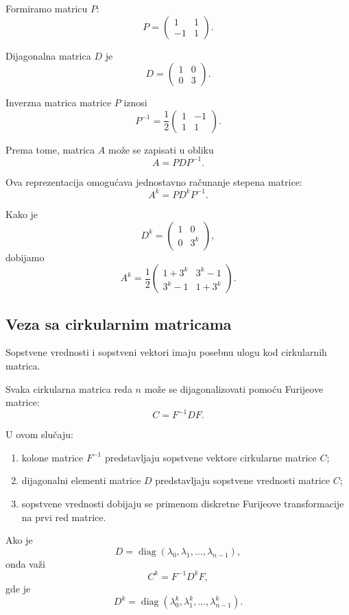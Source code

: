 \documentclass[12pt,a4paper]{report}
\begin{document}
Formiramo matricu $P$:
\[
P=
\begin{pmatrix}
	1 & 1\\
	-1 & 1
\end{pmatrix}.
\]

Dijagonalna matrica $D$ je
\[
D=
\begin{pmatrix}
	1 & 0\\
	0 & 3
\end{pmatrix}.
\]

Inverzna matrica matrice $P$ iznosi
\[
P^{-1}=
\frac{1}{2}
\begin{pmatrix}
	1 & -1\\
	1 & 1
\end{pmatrix}.
\]

Prema tome, matrica $A$ može se zapisati u obliku
\[
\boxed{
	A=PDP^{-1}.
}
\]

Ova reprezentacija omogućava jednostavno računanje
stepena matrice:
\[
A^k=PD^kP^{-1}.
\]

Kako je
\[
D^k=
\begin{pmatrix}
	1 & 0\\
	0 & 3^k
\end{pmatrix},
\]
dobijamo
\[
A^k=
\frac{1}{2}
\begin{pmatrix}
	1+3^k & 3^k-1\\
	3^k-1 & 1+3^k
\end{pmatrix}.
\]

\subsection{Veza sa cirkularnim matricama}

Sopstvene vrednosti i sopstveni vektori imaju posebnu
ulogu kod cirkularnih matrica.

Svaka cirkularna matrica reda $n$ može se dijagonalizovati
pomoću Furijeove matrice:
\[
\boxed{
	C=F^{-1}DF.
}
\]

U ovom slučaju:
\begin{enumerate}
	\item kolone matrice $F^{-1}$ predstavljaju sopstvene
	vektore cirkularne matrice $C$;
	\item dijagonalni elementi matrice $D$ predstavljaju
	sopstvene vrednosti matrice $C$;
	\item sopstvene vrednosti dobijaju se primenom
	diskretne Furijeove transformacije na prvi red matrice.
\end{enumerate}

Ako je
\[
D=\operatorname{diag}(\lambda_0,\lambda_1,\ldots,\lambda_{n-1}),
\]
onda važi
\[
C^k=F^{-1}D^kF,
\]
gde je
\[
D^k=
\operatorname{diag}
(\lambda_0^k,\lambda_1^k,\ldots,\lambda_{n-1}^k).
\]
\end{document}
